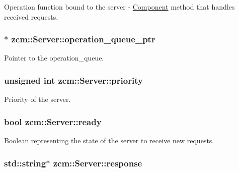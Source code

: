 Operation function bound to the server -\/ \hyperlink{classzcm_1_1Component}{Component} method that handles received requests. 

\hypertarget{classzcm_1_1Server_a667c0fef537aa6acc6245d956250c860}{
\subsubsection[{operation\-\_\-queue\-\_\-ptr}]{$\ast$ zcm\-::\-Server\-::operation\-\_\-queue\-\_\-ptr\hspace{0.3cm}{\ttfamily [private]}}}\label{classzcm_1_1Server_a667c0fef537aa6acc6245d956250c860}


Pointer to the operation\-\_\-queue. 

\hypertarget{classzcm_1_1Server_ad088a068dc025ff7aa4bf560cc7c43c1}{
\subsubsection[{priority}]{\setlength{\rightskip}{0pt plus 5cm}unsigned int zcm\-::\-Server\-::priority\hspace{0.3cm}{\ttfamily [private]}}}\label{classzcm_1_1Server_ad088a068dc025ff7aa4bf560cc7c43c1}


Priority of the server. 

\hypertarget{classzcm_1_1Server_a709ad2426e77a5e442d70a762cbe504b}{
\subsubsection[{ready}]{\setlength{\rightskip}{0pt plus 5cm}bool zcm\-::\-Server\-::ready\hspace{0.3cm}{\ttfamily [private]}}}\label{classzcm_1_1Server_a709ad2426e77a5e442d70a762cbe504b}


Boolean representing the state of the server to receive new requests. 

\hypertarget{classzcm_1_1Server_a4bfa93eb7b4a1d42777b9f1a2326700f}{
\subsubsection[{response}]{\setlength{\rightskip}{0pt plus 5cm}std\-::string$\ast$ zcm\-::\-Server\-::response\hspace{0.3cm}{\ttfamily [private]}}}\label{classzcm_1_1Server_a4bfa93eb7b4a1d42777b9f1a2326700f}


